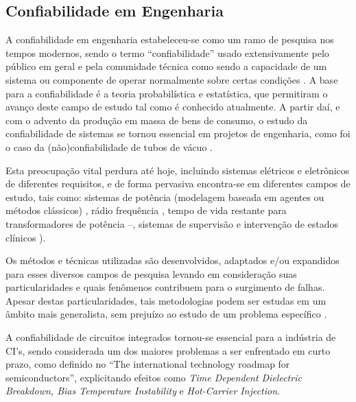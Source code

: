 \subsection{Confiabilidade em Engenharia}
\label{subsection_Conf_Eng}
A confiabilidade em engenharia estabeleceu-se como um ramo de pesquisa nos tempos modernos, sendo o termo ``confiabilidade'' usado extensivamente pelo público em geral e pela comunidade técnica como sendo a capacidade de um sistema ou componente de operar normalmente sobre certas condições \cite{Maricau2013}. A base para a confiabilidade é a teoria probabilística e estatística, que permitiram o avanço deste campo de estudo tal como é conhecido atualmente. A partir daí, e com o advento da produção em massa de bens de consumo, o estudo da confiabilidade de sistemas se tornou essencial em projetos de engenharia, como foi o caso da (não)confiabilidade de tubos de vácuo \cite{Maricau2013}\cite{Saleh2006}.

Esta preocupação vital perdura até hoje, incluindo sistemas elétricos e eletrônicos de diferentes requisitos, e de forma pervasiva encontra-se em diferentes campos de estudo, tais como: sistemas de potência (modelagem baseada em agentes ou métodos clássicos) \cite{Endrenyi1979}\cite{Schlapfer}, rádio frequência \cite{Stephens2009}\cite{Larcher2006}, tempo de vida restante para transformadores de potência \cite{Osorio}–\cite{Jirutitijaroen2004}, sistemas de supervisão  e intervenção de estados clínicos \cite{LIMOUSIN1997}\cite{Arain2012}).

Os métodos e técnicas utilizadas são desenvolvidos, adaptados e/ou expandidos para esses diversos campos de pesquisa levando em consideração suas particularidades e quais fenômenos contribuem para o surgimento de falhas. Apesar destas particularidades, tais metodologias podem ser estudas em um âmbito mais generalista, sem prejuízo ao estudo de um problema específico \cite{Nelson2004}.

A confiabilidade de circuitos integrados tornou-se essencial para a indústria de CI's, sendo considerada um dos maiores problemas a ser enfrentado em curto prazo, como definido no ``The international technology roadmap for semiconductors''\cite{Hoefflinger2011}, explicitando efeitos como \textit{Time Dependent Dielectric Breakdown, Bias Temperature Instability} e \textit{Hot-Carrier Injection}.

